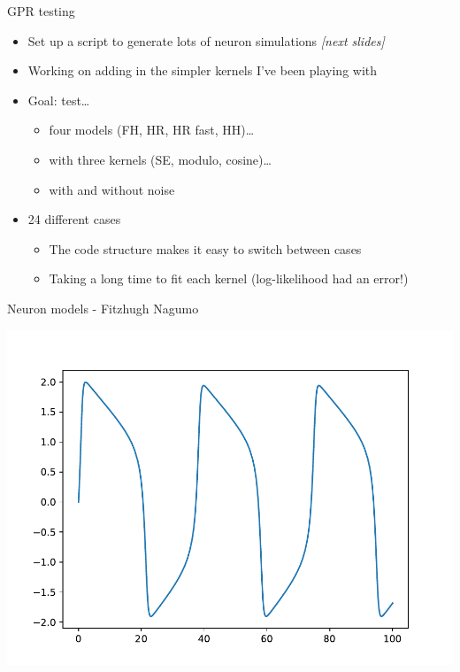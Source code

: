 \documentclass[presentation]{beamer}
\begin{document}
\begin{frame}[label={sec:orge4e8875}]{GPR testing}
\begin{itemize}
\item Set up a script to generate lots of neuron simulations \emph{[next slides]}
\item Working on adding in the simpler kernels I've been playing with
\item Goal: test\ldots{}
\begin{itemize}
\item four models (FH, HR, HR fast, HH)\ldots{}
\item with three kernels (SE, modulo, cosine)\ldots{}
\item with and without noise
\end{itemize}
\item 24 different cases
\begin{itemize}
\item The code structure makes it easy to switch between cases
\item Taking a long time to fit each kernel (log-likelihood had an error!)
\end{itemize}
\end{itemize}
\end{frame}

\begin{frame}[plain,label={sec:org28022af}]{Neuron models - Fitzhugh Nagumo}
\begin{center}
\includegraphics[width=\textwidth]{./clean_FH.pdf}
\end{center}
\end{frame}
\end{document}
